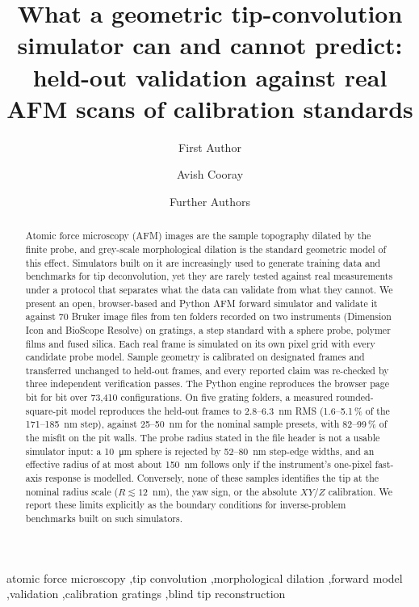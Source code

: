 \documentclass[preprint,12pt]{elsarticle}
\begin{document}
\begin{frontmatter}

\title{What a geometric tip-convolution simulator can and cannot predict:\\
held-out validation against real AFM scans of calibration standards}

\author[isu]{First Author} %
\author[isu]{Avish Cooray} %
\author[isu]{Further Authors} %

\begin{abstract}
Atomic force microscopy (AFM) images are the sample topography dilated by the finite probe, and
grey-scale morphological dilation is the standard geometric model of this effect. Simulators built
on it are increasingly used to generate training data and benchmarks for tip deconvolution, yet
they are rarely tested against real measurements under a protocol that separates what the data can
validate from what they cannot. We present an open, browser-based and Python AFM forward simulator
and validate it against 70 Bruker image files from ten folders recorded on two instruments
(Dimension Icon and BioScope Resolve) on gratings, a step standard with a sphere probe, polymer
films and fused silica. Each real frame is simulated on its own pixel grid with every candidate
probe model. Sample geometry is calibrated on designated frames and transferred unchanged to
held-out frames, and every reported claim was re-checked by three independent verification passes.
The Python engine reproduces the browser page bit for bit over 73,410 configurations. On five
grating folders, a measured rounded-square-pit model reproduces the held-out frames to
2.8--6.3~nm RMS (1.6--5.1\,\% of the 171--185~nm step), against 25--50~nm for the nominal sample
presets, with 82--99\,\% of the misfit on the pit walls. The probe radius stated in the file header
is not a usable simulator input: a 10~\si{\micro\metre} sphere is rejected by 52--80~nm step-edge
widths, and an effective radius of at most about 150~nm follows only if the instrument's
one-pixel fast-axis response is modelled. Conversely, none of these samples identifies the tip at
the nominal radius scale ($R \lesssim 12$~nm), the yaw sign, or the absolute $XY$/$Z$ calibration.
We report these limits explicitly as the boundary conditions for inverse-problem benchmarks built
on such simulators.
\end{abstract}

\begin{keyword}
atomic force microscopy \sep tip convolution \sep morphological dilation \sep forward model
\sep validation \sep calibration gratings \sep blind tip reconstruction
\end{keyword}

\end{frontmatter}
\end{document}
